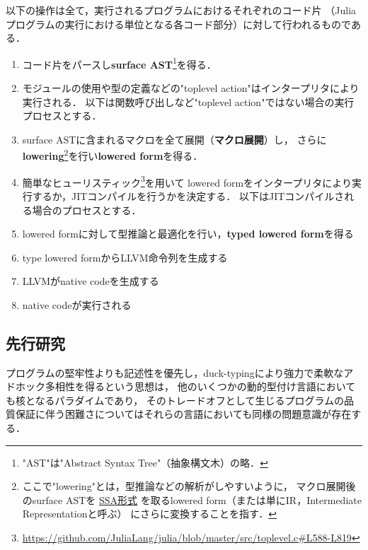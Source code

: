 以下の操作は全て，実行されるプログラムにおけるそれぞれのコード片
（Juliaプログラムの実行における単位となる各コード部分）に対して行われるものである．

\begin{enumerate}
  \item コード片をパースし\textbf{surface AST}\footnote{
          "AST"は"Abstract Syntax Tree"（抽象構文木）の略．
        }を得る．
  \item モジュールの使用や型の定義などの"toplevel action"はインタープリタにより実行される．
        以下は関数呼び出しなど"toplevel action"ではない場合の実行プロセスとする．
  \item surface ASTに含まれるマクロを全て展開（\textbf{マクロ展開}）し，
        さらに\textbf{lowering}\footnote{
          ここで"lowering"とは，型推論などの解析がしやすいように，
          マクロ展開後のsurface ASTを
          \href{https://docs.julialang.org/en/latest/devdocs/ssair/}{SSA形式}
          を取るlowered form（または単にIR，Intermediate Representationと呼ぶ）
          にさらに変換することを指す．
        }を行い\textbf{lowered form}を得る．
  \item 簡単なヒューリスティック\footnote{
          \url{https://github.com/JuliaLang/julia/blob/master/src/toplevel.c\#L588-L819}
        }を用いて
        lowered formをインタープリタにより実行するか，JITコンパイルを行うかを決定する．
        以下はJITコンパイルされる場合のプロセスとする．
  \item lowered formに対して型推論と最適化を行い，\textbf{typed lowered form}を得る
  \item type lowered formからLLVM命令列を生成する
  \item LLVMがnative codeを生成する
  \item native codeが実行される
\end{enumerate}

\subsection{先行研究} \label{subsection:prev-reseaches}


プログラムの堅牢性よりも記述性を優先し，duck-typingにより強力で柔軟なアドホック多相性を得るという思想は，
他のいくつかの動的型付け言語においても核となるパラダイムであり，
そのトレードオフとして生じるプログラムの品質保証に伴う困難さについてはそれらの言語においても同様の問題意識が存在する．

